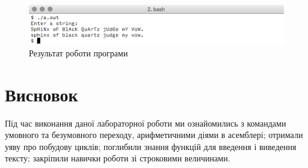 \documentclass[a4paper,oneside,DIV=12,12pt,headings=normal]{scrartcl}
\begin{document}
		\begin{figure}[!htbp]
		\centering
			\includegraphics[width = \linewidth]{./assets/y02s02-sysprog-lab-02-programres.png}
		\caption{Результат роботи програми}
		\label{fig:program-result-screenshot}
		\end{figure}
		
	\section{Висновок}
		Під час виконання даної лабораторної роботи ми ознайомились з командами умовного та безумовного переходу, арифметичними діями в асемблері; отримали уяву про побудову циклів; поглибили знання функцій для введення і виведення тексту; закріпили навички роботи зі строковими величинами.
\end{document}
